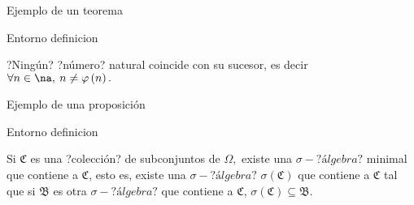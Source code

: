\documentclass[]{beamer}
\theoremstyle{plain}
\begin{document}
\begin{frame}[fragile]{Ejemplo de un teorema} 
\begin{source}{Entorno definicion}{}
\begin{teorema}
?Ningún? ?número? natural coincide con su sucesor, es decir $\forall n\in\na,\: n\neq\varphi\left(n\right).$
\end{teorema}
\end{source}
\scalebox{0.7}{
\begin{teorema}
Ningún número natural coincide con su sucesor, es decir $\forall n\in I\!N,\: n\neq\varphi\left(n\right).$
\end{teorema}
}
\end{frame}
\begin{frame}[fragile]{Ejemplo de una proposición}
\begin{source}{Entorno definicion}{}
\begin{proposicion}
Si $\mathfrak{C}$ es una ?colección? de subconjuntos de $\Omega,$ existe una $\sigma-?álgebra?$ minimal que contiene a $\mathfrak{C}$, esto es, existe una $\sigma-?álgebra?$ $\sigma (\mathfrak{C})$ que contiene a $\mathfrak{C}$  tal que si $\mathfrak{B}$ es otra $\sigma-?álgebra?$ que contiene a $\mathfrak{C}$, $\sigma (\mathfrak{C})\subseteq \mathfrak{B}.$
\end{proposicion}
\end{source}
\end{frame}
\end{document}
